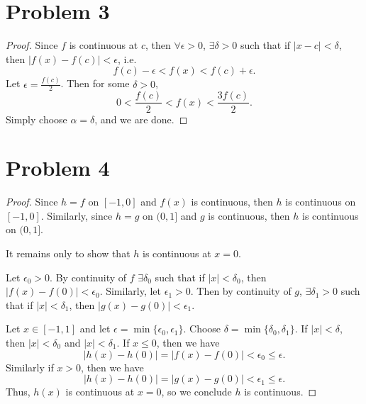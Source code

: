 \documentclass{article}
\begin{document}
\section*{Problem 3}
\begin{proof}
	Since $f$ is continuous at $c$, then $\forall \epsilon > 0 $, $\exists \delta > 0$ such that if $|x - c| < \delta$, then $|f(x) - f(c)| < \epsilon$, i.e.
	\begin{equation}
		f(c) - \epsilon < f(x) < f(c) + \epsilon.
	\end{equation}
	Let $\epsilon = \frac{f(c)}{2}$. Then for some $\delta > 0$,
	\begin{equation}
		0 < \frac{f(c)}{2} < f(x) < \frac{3 f(c)}{2}.
	\end{equation}
	Simply choose $\alpha = \delta$, and we are done.
\end{proof}
\section*{Problem 4}
\begin{proof}
	Since $h = f$ on $[-1, 0]$ and $f(x)$ is continuous, then $h$ is continuous on $[-1, 0]$. Similarly, since $h = g$ on $(0, 1]$ and $g$ is continuous, then $h$ is continuous on $(0, 1]$. 
	
	It remains only to show that $h$ is continuous at $x = 0$.
	
	Let $\epsilon_0 > 0$. By continuity of $f$ $\exists \delta_0$ such that if $|x| < \delta_0$, then $|f(x) - f(0)| < \epsilon_0$. Similarly, let $\epsilon_1 >0$. Then by continuity of $g$, $\exists \delta_1 > 0$ such that if $|x| < \delta_1$, then $|g(x) - g(0)| < \epsilon_1$.
	
	Let $x \in [-1, 1]$ and let $\epsilon = \min\{\epsilon_0, \epsilon_1\}$. Choose $\delta = \min\{\delta_0, \delta_1\}$. If $|x| < \delta$, then $|x| < \delta_0$ and $|x| < \delta_1$. If $x \leq 0$, then we have
	\begin{equation}
		|h(x) - h(0)| = |f(x) - f(0)| < \epsilon_0 \leq \epsilon.
	\end{equation}
	Similarly if $x > 0$, then we have
	\begin{equation}
		|h(x) - h(0)| = |g(x) - g(0)| < \epsilon_1 \leq \epsilon.
	\end{equation}
	Thus, $h(x)$ is continuous at $x=0$, so we conclude $h$ is continuous.
\end{proof}
\end{document}
